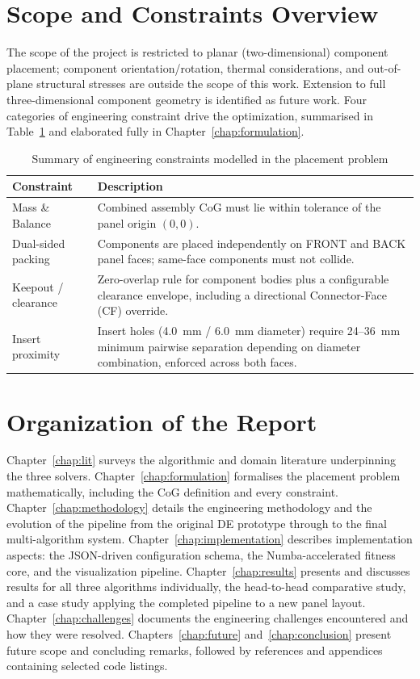 \documentclass[11pt,a4paper,oneside]{report}
\begin{document}
\section{Scope and Constraints Overview}
The scope of the project is restricted to planar (two-dimensional) component placement; component orientation/rotation, thermal considerations, and out-of-plane structural stresses are outside the scope of this work. Extension to full three-dimensional component geometry is identified as future work. Four categories of engineering constraint drive the optimization, summarised in Table~\ref{tab:constraint_summary} and elaborated fully in Chapter~\ref{chap:formulation}.

\begin{table}[H]
\centering
\caption{Summary of engineering constraints modelled in the placement problem}
\label{tab:constraint_summary}
\begin{tabular}{|p{3.2cm}|p{9.5cm}|}
\hline
\textbf{Constraint} & \textbf{Description} \\
\hline
Mass \& Balance & Combined assembly CoG must lie within tolerance of the panel origin $(0,0)$. \\ \hline
Dual-sided packing & Components are placed independently on FRONT and BACK panel faces; same-face components must not collide. \\ \hline
Keepout / clearance & Zero-overlap rule for component bodies plus a configurable clearance envelope, including a directional Connector-Face (CF) override. \\ \hline
Insert proximity & Insert holes (4.0~mm / 6.0~mm diameter) require 24--36~mm minimum pairwise separation depending on diameter combination, enforced across both faces. \\
\hline
\end{tabular}
\end{table}

\section{Organization of the Report}
Chapter~\ref{chap:lit} surveys the algorithmic and domain literature underpinning the three solvers. Chapter~\ref{chap:formulation} formalises the placement problem mathematically, including the CoG definition and every constraint. Chapter~\ref{chap:methodology} details the engineering methodology and the evolution of the pipeline from the original DE prototype through to the final multi-algorithm system. Chapter~\ref{chap:implementation} describes implementation aspects: the JSON-driven configuration schema, the Numba-accelerated fitness core, and the visualization pipeline. Chapter~\ref{chap:results} presents and discusses results for all three algorithms individually, the head-to-head comparative study, and a case study applying the completed pipeline to a new panel layout. Chapter~\ref{chap:challenges} documents the engineering challenges encountered and how they were resolved. Chapters~\ref{chap:future} and~\ref{chap:conclusion} present future scope and concluding remarks, followed by references and appendices containing selected code listings.
\end{document}
